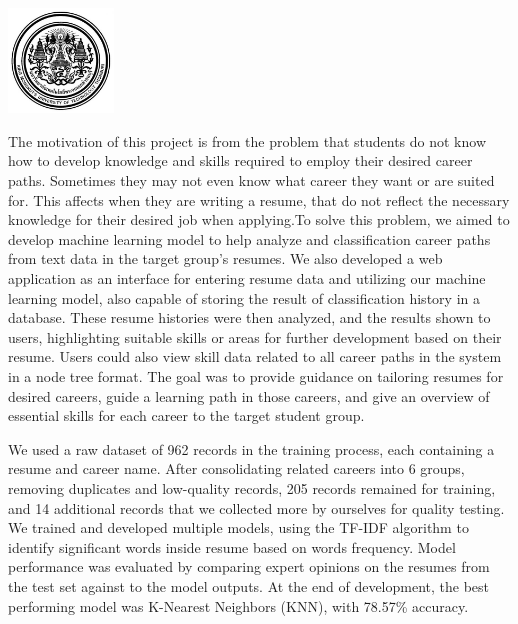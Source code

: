 \documentclass[12pt,oneside,openright,a4paper]{cpe-thai-project}
\begin{document}
\pdfstringdefDisableCommands{%
    \let\MakeUppercase\relax
}

\begin{center}
    \includegraphics[width=2.8cm]{logo02.jpg}
\end{center}
\vspace*{-1cm}

\maketitlepage
\makesignaturepage

\abstract

The motivation of this project is from the problem that students do not know how to develop knowledge and skills required to 
employ their desired career paths. Sometimes they may not even know what career they want or are suited for. This affects when 
they are writing a resume, that do not reflect the necessary knowledge for their desired job when applying.To solve this problem, 
we aimed to develop machine learning model to help analyze and classification career paths from text data in the target group's 
resumes. We also developed a web application as an interface for entering resume data and utilizing our machine learning model, 
also capable of storing the result of classification history in a database. These resume histories were then analyzed, and 
the results shown to users, highlighting suitable skills or areas for further development based on their resume. Users could 
also view skill data related to all career paths in the system in a node tree format. The goal was to provide guidance on 
tailoring resumes for desired careers, guide a learning path in those careers, and give an overview of essential skills for each 
career to the target student group.

We used a raw dataset of 962 records in the training process, each containing a resume and career name. 
After consolidating related careers into 6 groups, removing duplicates and low-quality records, 205 records remained for training, 
and 14 additional records that we collected more by ourselves for quality testing. We trained and developed multiple models, 
using the TF-IDF algorithm to identify significant words inside resume based on words frequency. Model performance was evaluated 
by comparing expert opinions on the resumes from the test set against to the model outputs. At the end of development, the best 
performing model was K-Nearest Neighbors (KNN), with 78.57\% accuracy.
\end{document}
